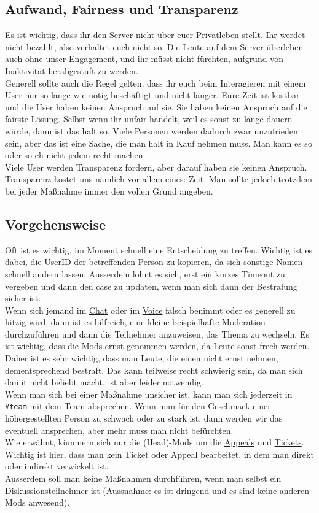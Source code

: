 \documentclass[a4paper,12pt]{article}
\begin{document}
\subsection{Aufwand, Fairness und Transparenz}
Es ist wichtig, dass ihr den Server nicht über euer Privatleben stellt. Ihr werdet nicht bezahlt, also verhaltet euch nicht so.
Die Leute auf dem Server überleben auch ohne unser Engagement, und ihr müsst nicht fürchten, aufgrund von Inaktivität herabgestuft zu werden.\\
Generell sollte auch die Regel gelten, dass ihr euch beim Interagieren mit einem User nur so lange wie nötig beschäftigt und nicht länger.
Eure Zeit ist kostbar und die User haben keinen Anspruch auf sie. Sie haben keinen Anspruch auf die fairste Lösung. Selbst wenn ihr unfair handelt, weil
es sonst zu lange dauern würde, dann ist das halt so. Viele Personen werden dadurch zwar unzufrieden sein, aber das ist eine Sache, die man halt in Kauf nehmen muss.
Man kann es so oder so eh nicht jedem recht machen.\\
Viele User werden Transparenz fordern, aber darauf haben sie keinen Anspruch. Transparenz kostet uns nämlich vor allem eines: Zeit. Man sollte jedoch trotzdem bei jeder Maßnahme immer den vollen Grund angeben.\\
\subsection{Vorgehensweise}
Oft ist es wichtig, im Moment schnell eine Entscheidung zu treffen. Wichtig ist es dabei, die UserID der betreffenden Person zu kopieren, da sich sonstige Namen schnell ändern lassen. Ausserdem lohnt es sich, erst ein kurzes Timeout zu vergeben und dann den case zu updaten, wenn man sich dann der Bestrafung sicher ist.\\
Wenn sich jemand im \hyperlink{term:chat}{Chat} oder im \hyperlink{term:vc}{Voice} falsch benimmt oder es generell zu hitzig wird, dann ist es hilfreich, eine kleine beispielhafte Moderation durchzuführen und dann die Teilnehmer anzuweisen, das Thema zu wechseln.
Es ist wichtig, dass die Mods ernst genommen werden, da Leute sonst frech werden. Daher ist es sehr wichtig, dass man Leute, die einen nicht ernst nehmen, dementsprechend bestraft.
Das kann teilweise recht schwierig sein, da man sich damit nicht beliebt macht, ist aber leider notwendig.\\
Wenn man sich bei einer Maßnahme unsicher ist, kann man sich jederzeit in \texttt{\#team} mit dem Team absprechen. Wenn man für den Geschmack einer höhergestellten Person zu schwach oder zu stark ist, dann werden wir das eventuell ansprechen, aber mehr muss man nicht befürchten.\\
Wie erwähnt, kümmern sich nur die (Head)-Mods um die \hyperlink{term:appeal}{Appeals} und \hyperlink{term:ticket}{Tickets}. Wichtig ist hier, dass man kein Ticket oder Appeal
bearbeitet, in dem man direkt oder indirekt verwickelt ist. \\
Ausserdem soll man keine Maßnahmen durchführen, wenn man selbst ein Diskussionsteilnehmer ist (Aussnahme: es ist dringend und es sind keine anderen Mods anwesend).
\end{document}
